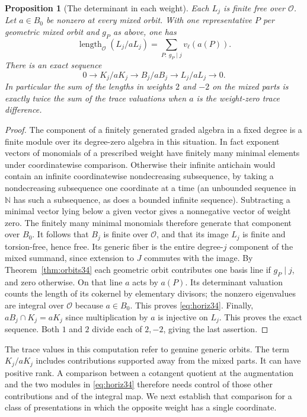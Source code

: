 \documentclass[a4paper,11pt]{article}
\newtheorem{proposition}{Proposition}[section]
\theoremstyle{definition}
\theoremstyle{remark}
\newcommand{\len}{\operatorname{length}}\newcommand{\Res}{\operatorname*{Res}}
\numberwithin{equation}{section}
\newcommand{\OO}{\mathcal O}
\begin{document}
\begin{proposition}[The determinant in each weight]\label{prop:horizontal34}
Each \(L_j\) is finite free over \(\OO\). Let \(a\in B_0\) be nonzero at every mixed orbit. With one representative \(P\) per geometric mixed orbit and \(g_P\) as above, one has
\begin{equation}
 \len_{\OO}(L_j/aL_j)=\sum_{P:\ g_P\mid j}v_\ell(a(P)).
                                                               \label{eq:horiz34}
\end{equation}
There is an exact sequence
\[
 0\longrightarrow K_j/aK_j\longrightarrow B_j/aB_j
       \longrightarrow L_j/aL_j\longrightarrow0 .
\]
In particular the sum of the lengths in weights \(2\) and \(-2\) on the mixed parts is exactly twice the sum of the trace valuations when \(a\) is the weight-zero trace difference.
\end{proposition}
\begin{proof}
The component of a finitely generated graded algebra in a fixed degree is a finite module over its degree-zero algebra in this situation. In fact exponent vectors of monomials of a prescribed weight have finitely many minimal elements under coordinatewise comparison. Otherwise their infinite antichain would contain an infinite coordinatewise nondecreasing subsequence, by taking a nondecreasing subsequence one coordinate at a time (an unbounded sequence in \(\mathbb N\) has such a subsequence, as does a bounded infinite sequence). Subtracting a minimal vector lying below a given vector gives a nonnegative vector of weight zero. The finitely many minimal monomials therefore generate that component over \(B_0\). It follows that \(B_j\) is finite over \(\OO\), and that its image \(L_j\) is finite and torsion-free, hence free. Its generic fiber is the entire degree-\(j\) component of the mixed summand, since extension to \(J\) commutes with the image. By Theorem~\ref{thm:orbits34} each geometric orbit contributes one basis line if \(g_P\mid j\), and zero otherwise. On that line \(a\) acts by \(a(P)\). Its determinant valuation counts the length of its cokernel by elementary divisors; the nonzero eigenvalues are integral over \(\OO\) because \(a\in B_0\). This proves \eqref{eq:horiz34}. Finally, \(aB_j\cap K_j=aK_j\) since multiplication by \(a\) is injective on \(L_j\). This proves the exact sequence. Both \(1\) and \(2\) divide each of \(2,-2\), giving the last assertion.
\end{proof}

The trace values in this computation refer to genuine generic orbits. The term \(K_j/aK_j\) includes contributions supported away from the mixed parts. It can have positive rank. A comparison between a cotangent quotient at the augmentation and the two modules in \eqref{eq:horiz34} therefore needs control of those other contributions and of the integral map. We next establish that comparison for a class of presentations in which the opposite weight has a single coordinate.
\end{document}
